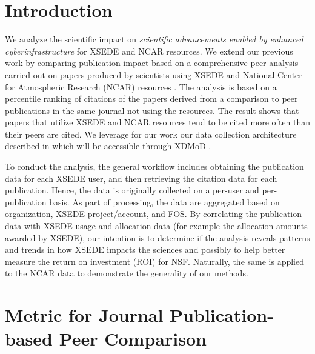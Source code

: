 \documentclass[10pt, conference, compsocconf]{IEEEtran}
\begin{document}

\section{Introduction} 


We analyze the scientific impact on {\em scientific advancements enabled by enhanced cyberinfrastructure} for XSEDE and NCAR resources. We extend our previous work \cite{las14impact} by comparing publication impact based on a comprehensive peer analysis carried out on papers produced by scientists using XSEDE and National Center for Atmospheric Research (NCAR) resources \cite{las15cluster-long,las15xsede}. The analysis is based on a percentile ranking of citations of the papers derived from a comparison to peer publications in the same journal not using the resources. The result shows that papers that utilize XSEDE and NCAR resources tend to be cited more often than their peers are cited. We leverage for our work our data collection architecture described in \cite{las14impact,las15cluster-long} which will be accessible through XDMoD \cite{Furlani:2013:UXF:2484762.2484763}. 

To conduct the analysis, the general workflow includes obtaining the publication data for each XSEDE user, and then retrieving the citation data for each publication. Hence, the data is originally collected on a per-user and per-publication basis. As part of processing, the data are aggregated based on organization, XSEDE project/account, and FOS.  By correlating the publication data with XSEDE usage and allocation data (for example the allocation amounts awarded by XSEDE), our intention is to determine if the analysis reveals patterns and trends in how XSEDE impacts the sciences and possibly to help better measure the return on investment (ROI) for NSF. Naturally, the same is applied to the NCAR data to demonstrate the generality of our methods.

\section{Metric for Journal Publication-based Peer Comparison} \label{S:metric}
\end{document}
